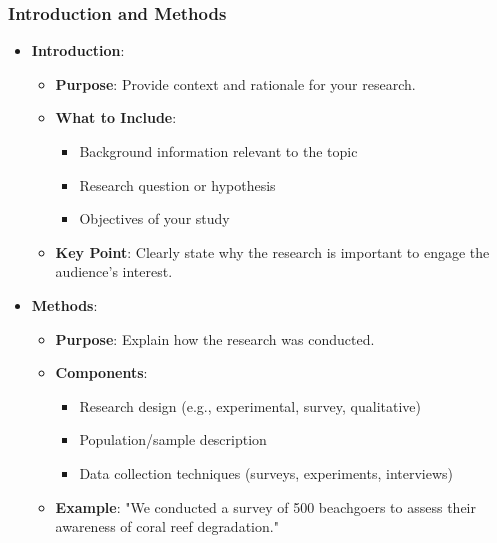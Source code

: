 \documentclass[aspectratio=169]{beamer}
\begin{document}
\begin{frame}[fragile]
    \frametitle{Introduction and Methods}
    \begin{itemize}
        \item \textbf{Introduction}:
        \begin{itemize}
            \item \textbf{Purpose}: Provide context and rationale for your research.
            \item \textbf{What to Include}:
            \begin{itemize}
                \item Background information relevant to the topic
                \item Research question or hypothesis
                \item Objectives of your study
            \end{itemize}
            \item \textbf{Key Point}: Clearly state why the research is important to engage the audience's interest.
        \end{itemize}
        
        \item \textbf{Methods}:
        \begin{itemize}
            \item \textbf{Purpose}: Explain how the research was conducted.
            \item \textbf{Components}:
            \begin{itemize}
                \item Research design (e.g., experimental, survey, qualitative)
                \item Population/sample description
                \item Data collection techniques (surveys, experiments, interviews)
            \end{itemize}
            \item \textbf{Example}: "We conducted a survey of 500 beachgoers to assess their awareness of coral reef degradation."
        \end{itemize}
    \end{itemize}
\end{frame}
\end{document}
